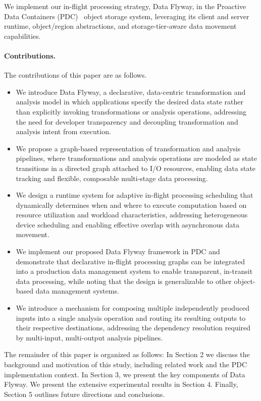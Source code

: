 We implement our in-flight processing strategy, Data Flyway, in the Proactive Data Containers (PDC)~\cite{pdc, pdcdocs} object storage system, leveraging its client and server runtime, object/region abstractions, and storage-tier-aware data movement capabilities.

\paragraph{Contributions.} The contributions of this paper are as follows.
\begin{itemize}
\item We introduce Data Flyway, a declarative, data-centric transformation  {\color{red}and analysis} model in which applications specify the desired data state rather than explicitly invoking transformations {\color{red}or analysis operations}, addressing the need for developer transparency and decoupling transformation {\color{red}and analysis} intent from execution.
\item We propose a graph-based representation of transformation {\color{red}and analysis} pipelines, where transformations {\color{red}and analysis operations} are modeled as state transitions in a directed graph attached to I/O resources, enabling data state tracking and flexible, composable multi-stage data processing.
\item We design a runtime system for adaptive in-flight processing scheduling that dynamically determines when and where to execute computation based on resource utilization and workload characteristics, addressing heterogeneous device scheduling and enabling effective overlap with asynchronous data movement.
\item We implement our proposed Data Flyway framework in PDC and demonstrate that declarative in-flight processing graphs can be integrated into a production data management system to enable transparent, in-transit data processing, while noting that the design is generalizable to other object-based data management systems.
\item {\color{red}We introduce a mechanism for composing multiple independently produced inputs into a single analysis operation and routing its resulting outputs to their respective destinations, addressing the dependency resolution required by multi-input, multi-output analysis pipelines.}
\end{itemize}

The remainder of this paper is organized as follows: In Section 2 we discuss the background and motivation of this study, including related work and the PDC implementation context. In Section 3, we present the key components of Data Flyway. We present the extensive experimental results in Section 4. Finally, Section 5 outlines future directions and conclusions.
